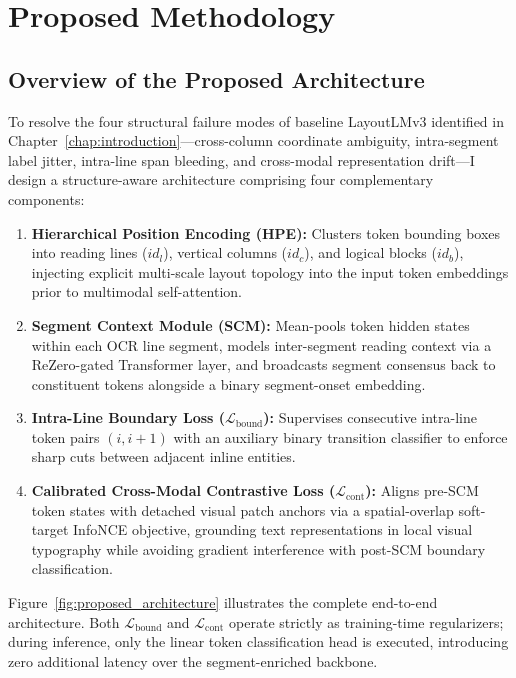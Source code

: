 \chapter{Proposed Methodology}
\label{chap:methodology}

\section{Overview of the Proposed Architecture}
\label{sec:method_overview}

To resolve the four structural failure modes of baseline LayoutLMv3 identified in Chapter~\ref{chap:introduction}—cross-column coordinate ambiguity, intra-segment label jitter, intra-line span bleeding, and cross-modal representation drift—I design a structure-aware architecture comprising four complementary components:
\begin{enumerate}
    \item \textbf{Hierarchical Position Encoding (HPE):} Clusters token bounding boxes into reading lines ($id_l$), vertical columns ($id_c$), and logical blocks ($id_b$), injecting explicit multi-scale layout topology into the input token embeddings prior to multimodal self-attention.
    \item \textbf{Segment Context Module (SCM):} Mean-pools token hidden states within each OCR line segment, models inter-segment reading context via a ReZero-gated Transformer layer, and broadcasts segment consensus back to constituent tokens alongside a binary segment-onset embedding.
    \item \textbf{Intra-Line Boundary Loss ($\mathcal{L}_{\text{bound}}$):} Supervises consecutive intra-line token pairs $(i, i+1)$ with an auxiliary binary transition classifier to enforce sharp cuts between adjacent inline entities.
    \item \textbf{Calibrated Cross-Modal Contrastive Loss ($\mathcal{L}_{\text{cont}}$):} Aligns pre-SCM token states with detached visual patch anchors via a spatial-overlap soft-target InfoNCE objective, grounding text representations in local visual typography while avoiding gradient interference with post-SCM boundary classification.
\end{enumerate}

Figure~\ref{fig:proposed_architecture} illustrates the complete end-to-end architecture. Both $\mathcal{L}_{\text{bound}}$ and $\mathcal{L}_{\text{cont}}$ operate strictly as training-time regularizers; during inference, only the linear token classification head is executed, introducing zero additional latency over the segment-enriched backbone.

